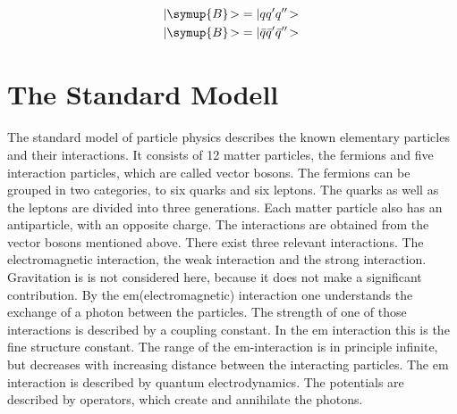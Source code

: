 \begin{align}
	|\symup{B}\!> &= |q q' q''\!> \\
	|\symup{B}\!> &= |\bar{q} \bar{q}' \bar{q}''\!> \,
\end{align}

\section{The Standard Modell}
\label{sec:sm}

The standard model of particle physics describes the known elementary particles and their interactions.
It consists of 12 matter particles, the fermions
and five interaction particles, which are called vector bosons. The
fermions can be grouped in two categories, to six quarks and
six leptons. The quarks as well as the leptons are divided into three generations.
Each matter particle also has an antiparticle, with an opposite charge.
The interactions are obtained from the vector bosons mentioned above. There
exist three relevant interactions. The electromagnetic interaction,
the weak interaction and the strong interaction. Gravitation is
is not considered here, because it does not make a significant contribution.
By the em(electromagnetic) interaction one understands the exchange
of a photon between the particles.
The strength of one of those interactions is
described by a coupling constant. In the em interaction this is the
fine structure constant\cite{alphas}. The range of the em-interaction is in principle
infinite, but decreases with increasing distance between the interacting particles.
The em interaction is described by quantum electrodynamics.
The potentials are described by operators, which create and annihilate the photons.

